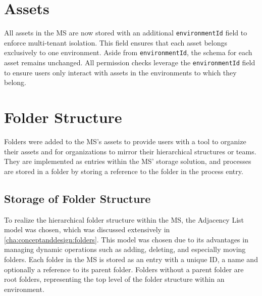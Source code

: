 %

\section{Assets}

All assets in the MS are now stored with an additional \lstinline{environmentId} field to enforce multi-tenant isolation.
This field ensures that each asset belongs exclusively to one environment.
Aside from \lstinline{environmentId}, the schema for each asset remains unchanged.
All permission checks leverage the \lstinline{environmentId} field to ensure users only interact with assets in the environments to which they belong.



\section{Folder Structure}

Folders were added to the MS's assets to provide users with a tool to organize their assets and
for organizations to mirror their hierarchical structures or teams.
They are implemented as entries within the MS' storage solution,
and processes are stored in a folder by storing a reference to the folder in the process entry.

\subsection{Storage of Folder Structure}

To realize the hierarchical folder structure within the MS,
the Adjacency List model was chosen,
which was discussed extensively in \ref{cha:conceptanddesign:folders}.
This model was chosen due to its advantages in managing dynamic operations such as 
adding, deleting, and especially moving folders.
Each folder in the MS is stored as an entry with a unique ID, a name and optionally a reference to
its parent folder.
Folders without a parent folder are root folders, representing the top level of the folder
structure within an environment.

